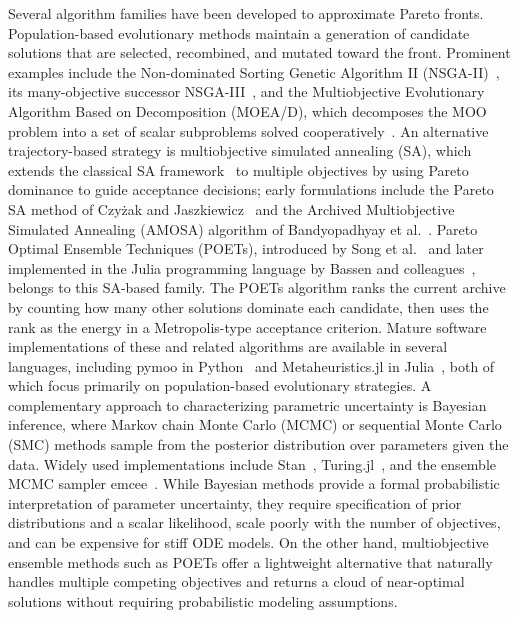 \documentclass[preprint,review,12pt]{elsarticle}
\begin{document}
Several algorithm families have been developed to approximate Pareto fronts. Population-based evolutionary methods maintain a generation of candidate solutions that are selected, recombined, and mutated toward the front. Prominent examples include the Non-dominated Sorting Genetic Algorithm II (NSGA-II)~\cite{Deb2002}, its many-objective successor NSGA-III~\cite{Deb2014}, and the Multiobjective Evolutionary Algorithm Based on Decomposition (MOEA/D), which decomposes the MOO problem into a set of scalar subproblems solved cooperatively~\cite{Zhang2007}.
An alternative trajectory-based strategy is multiobjective simulated annealing (SA), which extends the classical SA framework~\cite{Kirkpatrick1983} to multiple objectives by using Pareto dominance to guide acceptance decisions; early formulations include the Pareto SA method of Czy\.{z}ak and Jaszkiewicz~\cite{Czyzak1998} and the Archived Multiobjective Simulated Annealing (AMOSA) algorithm of Bandyopadhyay et al.~\cite{Bandyopadhyay2008}. Pareto Optimal Ensemble Techniques (POETs), introduced by Song et al.~\cite{Song2010} and later implemented in the Julia programming language by Bassen and colleagues~\cite{Bassen2016}, belongs to this SA-based family. The  POETs algorithm ranks the current archive by counting how many other solutions dominate each candidate, then uses the rank as the energy in a Metropolis-type acceptance criterion. Mature software implementations of these and related algorithms are available in several languages, including pymoo in Python~\cite{Blank2020} and Metaheuristics.jl in Julia~\cite{Mejia2022}, both of which focus primarily on population-based evolutionary strategies. A complementary approach to characterizing parametric uncertainty is Bayesian inference, where Markov chain Monte Carlo (MCMC) or sequential Monte Carlo (SMC) methods sample from the posterior distribution over parameters given the data. Widely used implementations include Stan~\cite{Carpenter2017}, Turing.jl~\cite{Ge2018}, and the ensemble MCMC sampler emcee~\cite{ForemanMackey2013}. While Bayesian methods provide a formal probabilistic interpretation of parameter uncertainty, they require specification of prior distributions and a scalar likelihood, scale poorly with the number of objectives, and can be expensive for stiff ODE models. On the other hand, multiobjective ensemble methods such as POETs offer a lightweight alternative that naturally handles multiple competing objectives and returns a cloud of near-optimal solutions without requiring probabilistic modeling assumptions.
\end{document}
